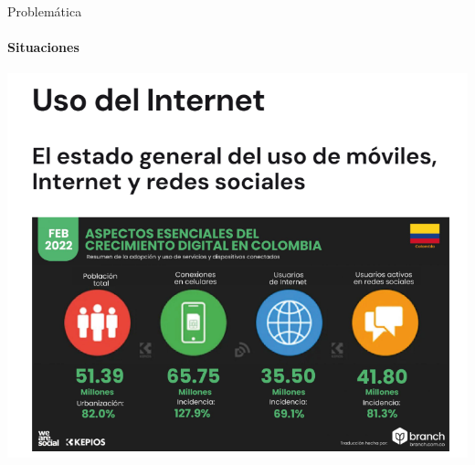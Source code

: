 \begin{frame}{Problemática}
    \framesubtitle{Situaciones}
    \begin{center}
        \includegraphics[height=.8\textheight]{./pictures/stats.png} \\
    \end{center}
\end{frame}